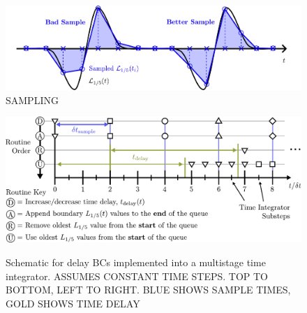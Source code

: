 \begin{figure}[t]
\centering
\includegraphics[scale=0.65]{assets/imgs/wave-sampling-comparison.pdf}
\caption{SAMPLING}
\label{fig:wave-sampling}
\end{figure}





\begin{figure}[t]
\centering
\includegraphics[scale=0.65]{assets/imgs/delay_bc_code_schematic.pdf}
\label{fig:schematic}
\caption{Schematic for delay BCs implemented into a multistage time integrator. ASSUMES CONSTANT TIME STEPS. TOP TO BOTTOM, LEFT TO RIGHT. BLUE SHOWS SAMPLE TIMES, GOLD SHOWS TIME DELAY}
\end{figure}


